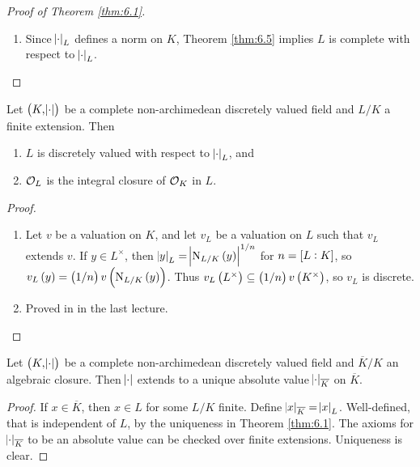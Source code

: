 \begin{proof}[Proof of Theorem \ref{thm:6.1}]
\begin{enumerate}
\begin{enumerate}[label=\arabic*.]
\end{enumerate}
\item Since $ \abs{\cdot}_L $ defines a norm on $ K $, Theorem \ref{thm:6.5} implies $ L $ is complete with respect to $ \abs{\cdot}_L $.
\end{enumerate}
\end{proof}


\begin{corollary}
Let $ \br{K, \abs{\cdot}} $ be a complete non-archimedean discretely valued field and $ L / K $ a finite extension. Then
\begin{enumerate}
\item $ L $ is discretely valued with respect to $ \abs{\cdot}_L $, and
\item $ \mathcal{O}_L $ is the integral closure of $ \mathcal{O}_K $ in $ L $.
\end{enumerate}
\end{corollary}

\begin{proof}
\hfill
\begin{enumerate}
\item Let $ v $ be a valuation on $ K $, and let $ v_L $ be a valuation on $ L $ such that $ v_L $ extends $ v $. If $ y \in L^\times $, then $ \abs{y}_L = \abs{\N_{L / K}\br{y}}^{1 / n} $ for $ n = \sbr{L : K} $, so $ v_L\br{y} = \br{1 / n}v\br{\N_{L / K}\br{y}} $. Thus $ v_L\br{L^\times} \subseteq \br{1 / n}v\br{K^\times} $, so $ v_L $ is discrete.
\item Proved in in the last lecture.
\end{enumerate}
\end{proof}

\begin{corollary}
Let $ \br{K, \abs{\cdot}} $ be a complete non-archimedean discretely valued field and $ \overline{K} / K $ an algebraic closure. Then $ \abs{\cdot} $ extends to a unique absolute value $ \abs{\cdot}_{\overline{K}} $ on $ \overline{K} $.
\end{corollary}

\begin{proof}
If $ x \in \overline{K} $, then $ x \in L $ for some $ L / K $ finite. Define $ \abs{x}_{\overline{K}} = \abs{x}_L $. Well-defined, that is independent of $ L $, by the uniqueness in Theorem \ref{thm:6.1}. The axioms for $ \abs{\cdot}_{\overline{K}} $ to be an absolute value can be checked over finite extensions. Uniqueness is clear.
\end{proof}

